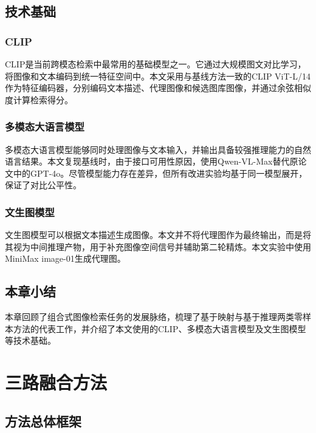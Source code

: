 \documentclass[12pt,a4paper,UTF8,oneside,openany]{ctexrep}
\begin{document}
\section{技术基础}

\subsection{CLIP}

CLIP\cite{radford2021learning}是当前跨模态检索中最常用的基础模型之一。它通过大规模图文对比学习，将图像和文本编码到统一特征空间中。本文采用与基线方法一致的CLIP ViT-L/14作为特征编码器，分别编码文本描述、代理图像和候选图库图像，并通过余弦相似度计算检索得分。

\subsection{多模态大语言模型}

多模态大语言模型能够同时处理图像与文本输入，并输出具备较强推理能力的自然语言结果。本文复现基线时，由于接口可用性原因，使用Qwen-VL-Max\cite{bai2023qwen}替代原论文中的GPT-4o\cite{openai2024gpt4o}。尽管模型能力存在差异，但所有改进实验均基于同一模型展开，保证了对比公平性。

\subsection{文生图模型}

文生图模型可以根据文本描述生成图像\cite{ramesh2022hierarchical, rombach2022high}。本文并不将代理图作为最终输出，而是将其视为中间推理产物，用于补充图像空间信号并辅助第二轮精炼。本文实验中使用MiniMax image-01生成代理图。

\section{本章小结}

本章回顾了组合式图像检索任务的发展脉络，梳理了基于映射与基于推理两类零样本方法的代表工作，并介绍了本文使用的CLIP、多模态大语言模型及文生图模型等技术基础。


\chapter{三路融合方法}

\section{方法总体框架}
\end{document}
